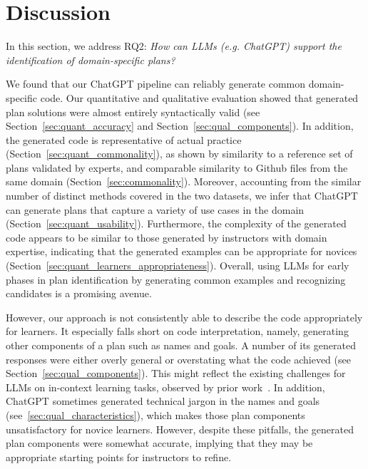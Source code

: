 \section{Discussion}

In this section, we address RQ2: \textit{How can LLMs (e.g. ChatGPT) support the identification of domain-specific plans?} 

We found that our ChatGPT pipeline can reliably generate common domain-specific code. 
Our quantitative and qualitative evaluation showed that generated plan solutions were almost entirely syntactically valid (see Section~\ref{sec:quant_accuracy} and Section~\ref{sec:qual_components}). 
In addition, the generated code is representative of actual practice (Section~\ref{sec:quant_commonality}), as shown by similarity to a reference set of plans validated by experts, and comparable similarity to Github files from the same domain (Section~\ref{sec:commonality}). Moreover, accounting from the similar number of distinct methods covered in the two datasets, we infer that ChatGPT can generate plans that capture a variety of use cases in the domain (Section~\ref{sec:quant_usability}). Furthermore, the complexity of the generated code appears to be similar to those generated by instructors with domain expertise, indicating that the generated examples can be appropriate for novices (Section~\ref{sec:quant_learners_appropriateness}). 
Overall, using LLMs for early phases in plan identification by generating common examples and recognizing candidates is a promising avenue.

However, our approach is not consistently able to describe the code appropriately for learners.
It especially falls short on code interpretation, namely, generating other components of a plan such as names and goals. A number of its generated responses were either overly general or overstating what the code achieved (see Section~\ref{sec:qual_components}). This might reflect the existing challenges for LLMs on in-context learning tasks, observed by prior work~\cite{llms_hard_incontext_learning}.
In addition, ChatGPT sometimes generated technical jargon in the names and goals (see~\ref{sec:qual_characteristics}), which makes those plan components unsatisfactory for novice learners. However, despite these pitfalls, the generated plan components were somewhat accurate, implying that they may be appropriate starting points for instructors to refine.

